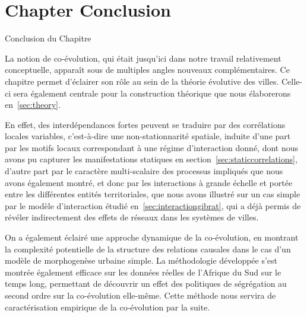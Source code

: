 




\newpage


\section*{Chapter Conclusion}{Conclusion du Chapitre}


La notion de co-évolution, qui était jusqu'ici dans notre travail relativement conceptuelle, apparaît sous de multiples angles nouveaux complémentaires. Ce chapitre permet d'éclairer son rôle au sein de la théorie évolutive des villes. Celle-ci sera également centrale pour la construction théorique que nous élaborerons en~\ref{sec:theory}.
 
En effet, des interdépendances fortes peuvent se traduire par des corrélations locales variables, c'est-à-dire une non-stationnarité spatiale, induite d'une part par les motifs locaux correspondant à une régime d'interaction donné, dont nous avons pu capturer les manifestations statiques en section~\ref{sec:staticcorrelations}, d'autre part par le caractère multi-scalaire des processus impliqués que nous avons également montré, et donc par les interactions à grande échelle et portée entre les différentes entités territoriales, que nous avons illustré sur un cas simple par le modèle d'interaction étudié en~\ref{sec:interactiongibrat}, qui a déjà permis de révéler indirectement des effets de réseaux dans les systèmes de villes. 

On a également éclairé une approche dynamique de la co-évolution, en montrant la complexité potentielle de la structure des relations causales dans le cas d'un modèle de morphogenèse urbaine simple. La méthodologie développée s'est montrée également efficace sur les données réelles de l'Afrique du Sud sur le temps long, permettant de découvrir un effet des politiques de ségrégation au second ordre sur la co-évolution elle-même. Cette méthode nous servira de caractérisation empirique de la co-évolution par la suite.





\stars

